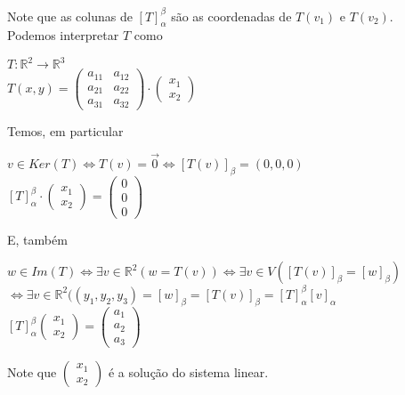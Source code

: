 \documentclass[12pt]{article}
\begin{document}
	Note que as colunas de $[T]^\beta_\alpha$ são as coordenadas de $T(v_1)$ e $T(v_2)$.\\
	Podemos interpretar $T$ como
	\begin{center}
		$T: \mathbb{R}^2 \rightarrow \mathbb{R}^3$\\[5pt]
		$T(x,y) = \begin{pmatrix} a_{11} & a_{12} \\ a_{21} & a_{22} \\ a_{31} & a_{32} \end{pmatrix} \cdot \begin{pmatrix} x_1 \\ x_2 \end{pmatrix}$
	\end{center}
	Temos, em particular
	\begin{center}
		$v \in Ker(T) \Leftrightarrow T(v) = \overrightarrow{0} \Leftrightarrow [T(v)]_\beta = (0, 0, 0)$\\[5pt]
		$[T]^\beta_\alpha \cdot \begin{pmatrix} x_1 \\ x_2 \end{pmatrix} = \begin{pmatrix} 0 \\ 0 \\ 0 \end{pmatrix}$
	\end{center}
	E, também
	\begin{center}
		$w \in Im(T) \Leftrightarrow \exists v \in \mathbb{R}^2( w = T(v) ) \Leftrightarrow \exists v \in V ([T(v)]_\beta = [w]_\beta)$\\ $\Leftrightarrow \exists v \in \mathbb{R}^2 ((y_1, y_2, y_3) = [w]_\beta = [T(v)]_\beta = [T]^\beta_\alpha [v]_\alpha$ \\[5pt]
		$[T]^\beta_\alpha \begin{pmatrix} x_1 \\ x_2 \end{pmatrix} = \begin{pmatrix} a_1 \\ a_2 \\ a_3 \end{pmatrix}$
	\end{center}
	Note que $ \begin{pmatrix} x_1 \\ x_2 \end{pmatrix}$ é a solução do sistema linear.
	
\end{document}

